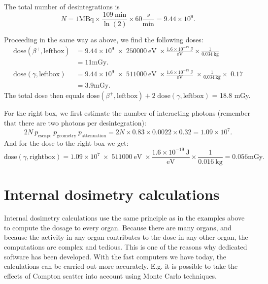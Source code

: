 \documentclass[11pt,oneside]{book}
\begin{document}
The total number of desintegrations is 
\begin{equation}
  N = 1 \mbox{MBq} \times \frac{109\ \mbox{min}}{\ln(2)} \times 60
    \frac{s}{\mbox{min}} = 9.44 \times 10^9.
\end{equation}

Proceeding in the same way as above, we find the following doses:
\begin{align}
\mbox{dose}(\beta^+,\mbox{leftbox}) &= 9.44 \times 10^9 \; \times \; 250000
    \ \mbox{eV} \; \times \frac{1.6 \times 10^{-19} \ \mbox{J}}{\mbox{eV}}
        \times \frac{1}{0.034 \ \mbox{kg}}  \nonumber\\
     &= 11 \mbox{mGy}.  \\
\mbox{dose}(\gamma, \mbox{leftbox}) &= 9.44 \times 10^9 \; \times
    \; 511000 \ \mbox{eV} \;
    \times \frac{1.6 \times 10^{-19} \ \mbox{J}}{\mbox{eV}} \;
     \times \frac{1}{0.034\ \mbox{kg}} \times \; 0.17 \nonumber\\
     &= 3.9 \mbox{mGy}.
\end{align}
The total dose then equals $\mbox{dose}(\beta^+,\mbox{leftbox}) + 2 \;
\mbox{dose}(\gamma, \mbox{leftbox})$ = 18.8 mGy.

For the right box, we first estimate the number of interacting photons
(remember that there are two photons per desintegration):
\begin{equation}
  2N \ p_{\mbox{escape}}\ p_{\mbox{geometry}}\ p_{\mbox{attenuation}}
   = 2N \times 0.83 \times 0.0022 \times 0.32 = 1.09 \times 10^7.
\end{equation}
And for the dose to the right box we get:
\begin{equation}
\mbox{dose}(\gamma, \mbox{rightbox}) = 1.09 \times 10^7\; \times \; 511000 \ \mbox{eV} \;
  \times \frac{1.6 \times 10^{-19} \ \mbox{J}}{\mbox{eV}}  \times \frac{1}{0.016\ \mbox{kg}}
   = 0.056 \mbox{mGy}.
\end{equation}


\section{Internal dosimetry calculations}
Internal dosimetry calculations use the same principle as in the
examples above to compute the dosage to every organ. Because there are
many organs, and because the activity in any organ contributes to the
dose in any other organ, the computations are complex and tedious.
This is one of the reasons why dedicated software has been developed.
With the fast computers we have today, the calculations can be carried
out more accurately. E.g.  it is possible to take the effects of
Compton scatter into account using Monte Carlo techniques.
\end{document}
